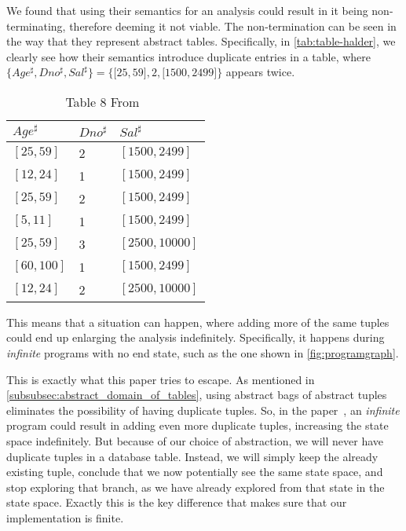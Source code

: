 We found that using their semantics for an analysis could result in it being non-terminating,
therefore deeming it not viable.
The non-termination can be seen in the way that they represent abstract tables.
Specifically, in \autoref{tab:table-halder},
we clearly see how their semantics introduce duplicate entries in a table, where $\{Age^\sharp,Dno^\sharp,Sal^\sharp\}=\{{[}25,59{]},2,{[}1500,2499{]}\}$ appears twice.


\begin{table}
    \renewcommand{\arraystretch}{1.3}
    \centering
    \caption{Table 8 From~\cite{halder_abstract_2012}}
    \begin{tabular}{lll}
        \toprule
        $Age^\sharp$ & $Dno^\sharp$ & $Sal^\sharp$   \\ \midrule
        $[25,59]$    & 2            & $[1500,2499]$  \\
        $[12,24]$    & 1            & $[1500,2499]$  \\
        $[25,59]$    & 2            & $[1500,2499]$  \\
        $[5,11]$     & 1            & $[1500,2499]$  \\
        $[25,59]$    & 3            & $[2500,10000]$ \\
        $[60,100]$   & 1            & $[1500,2499]$  \\
        $[12,24]$    & 2            & $[2500,10000]$ \\ \bottomrule
    \end{tabular}\label{tab:table-halder}
\end{table}


This means that a situation can happen, where adding more of the same tuples could end up enlarging the analysis indefinitely.
Specifically, it happens during \textit{infinite} programs with no end state, such as the one shown in \autoref{fig:programgraph}.


This is exactly what this paper tries to escape.
As mentioned in \autoref{subsubsec:abstract_domain_of_tables}, using abstract bags of abstract tuples eliminates the possibility of having duplicate tuples.
So, in the paper~\cite{halder_abstract_2012}, an \textit{infinite} program could result in adding even more duplicate tuples, increasing the state space indefinitely.
But because of our choice of abstraction, we will never have duplicate tuples in a database table.
Instead, we will simply keep the already existing tuple, conclude that we now potentially see the same state space, and stop exploring that branch, as we have already explored from that state in the state space.
Exactly this is the key difference that makes sure that our implementation is finite.

